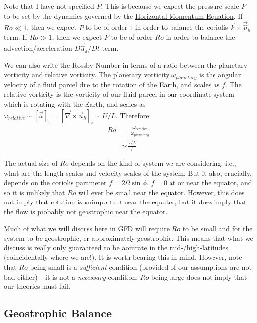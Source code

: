 Note that I have not specified $P$. This is because we expect the pressure scale $P$ to be set by the dynamics governed by the \hyperref[Horizontal Approximate]{Horizontal Momentum Equation}. If $Ro\ll 1$, then we expect $P$ to be of order $1$ in order to balance the coriolis $\vec{k}\times\vec{\hat{u}}_h$ term. If $Ro\gg 1$, then we expect $P$ to be of order $Ro$ in order to balance the advection/acceleration $D\vec{\hat{u}}_h/Dt$ term. 

We can also write the Rossby Number in terms of a ratio between the planetary vorticity and relative vorticity. The planetary vorticity $\omega_{planetary}$ is the angular velocity of a fluid parcel due to the rotation of the Earth, and scales as $f$. The relative vorticity is the vorticity of our fluid parcel in our coordinate system which is rotating with the Earth, and scales as $\omega_{relative}\sim[\vec{\omega}]_z=[\vec{\nabla}\times\vec{u}_h]_z\sim U/L$. Therefore:
\begin{align}
    Ro &= \frac{\omega_{relative}}{\omega_{planetary}}\\
    &\sim\frac{U/L}{f}
\end{align}

The actual size of $Ro$ depends on the kind of system we are considering: i.e., what are the length-scales and velocity-scales of the system. But it also, crucially, depends on the coriolis parameter $f=2\Omega\sin\phi$. $f=0$ at or near the equator, and so it is unlikely that $Ro$ will ever be small near the equator. However, this does not imply that rotation is unimportant near the equator, but it does imply that the flow is probably not geostrophic near the equator.

Much of what we will discuss here in GFD will require $Ro$ to be small and for the system to be geostrophic, or approximately geostrophic. This means that what we discuss is really only guaranteed to be accurate in the mid-/high-latitudes (coincidentally where we are!). It is worth bearing this in mind. However, note that $Ro$ being small is a \textit{sufficient} condition (provided of our assumptions are not bad either) – it is not a \textit{necessary} condition. $Ro$ being large does not imply that our theories must fail.

\subsection{Geostrophic Balance}

